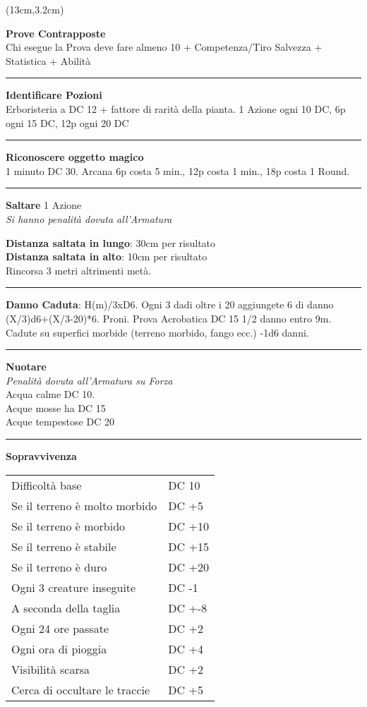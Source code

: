 \documentclass[a4paper,12 pt,openany]{book}
\newcommand{\riga}{\rule{\textwidth}{0.4pt}}
\begin{document}
\begin{textblock*}{7cm}(13cm,3.2cm) %

\textbf{Prove Contrapposte}\\
Chi esegue la Prova deve fare almeno 10 + Competenza/Tiro Salvezza + Statistica + Abilità

\riga

\textbf{Identificare  Pozioni}\\
Erboristeria a DC 12 + fattore di rarità della pianta.  1 Azione ogni 10 DC, 6p ogni 15 DC, 12p ogni 20 DC

\riga

\textbf{Riconoscere oggetto magico}\\
1 minuto DC 30. Arcana 6p costa 5 min., 12p costa 1 min., 18p costa 1 Round.
\riga

\textbf{Saltare} 1 Azione\\
\textit{Si hanno penalità dovuta all'Armatura}

\textbf{Distanza saltata in lungo}: 30cm per risultato\\

\textbf{Distanza saltata in alto}: 10cm per risultato\\

Rincorsa 3 metri altrimenti metà.

\riga

\textbf{Danno Caduta}: H(m)/3xD6. Ogni 3 dadi oltre i 20 aggiungete 6 di danno (X/3)d6+(X/3-20)*6. Proni. Prova Acrobatica DC 15 1/2 danno entro 9m.  Cadute su superfici morbide (terreno morbido, fango ecc.) -1d6 danni.

\riga

\textbf{Nuotare}\\
\textit{Penalità dovuta all'Armatura su Forza}\\
Acqua calme DC 10.\\
Acque mosse ha DC 15\\
Acque tempestose DC 20

\riga


\textbf{Sopravvivenza}
\begin{tabular}{ll}
Difficoltà base  & DC 10\\
Se il terreno è molto morbido& DC +5\\
Se il terreno è morbido& DC +10\\
Se il terreno è stabile& DC +15\\
Se il terreno è duro& DC +20\\
Ogni 3 creature inseguite& DC -1\\
A seconda della taglia& DC +-8\\
Ogni 24 ore passate&DC +2\\
Ogni ora di pioggia&DC +4\\
Visibilità scarsa&DC +2\\
Cerca di occultare le traccie&DC +5\\
\end{tabular}\\


\end{textblock*}
\end{document}
